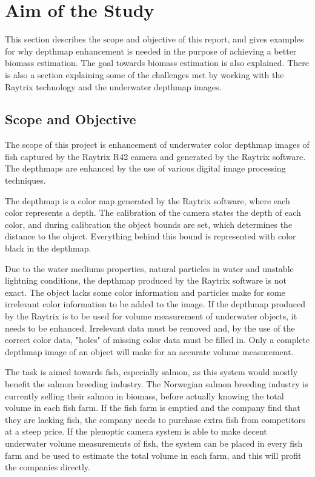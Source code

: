 \section{Aim of the Study}\label{aim of study}

This section describes the scope and objective of this report, and gives examples for why depthmap enhancement is needed in the purpose of achieving a better biomass estimation. The goal towards biomass estimation is also explained. There is also a section explaining some of the challenges met by working with the Raytrix technology and the underwater depthmap images.


\subsection{Scope and Objective}

The scope of this project is enhancement of underwater color depthmap images of fish captured by the Raytrix R42 camera and generated by the Raytrix software. The depthmaps are enhanced by the use of various digital image processing techniques.

The depthmap is a color map generated by the Raytrix software, where each color represents a depth. The calibration of the camera states the depth of each color, and during calibration the object bounds are set, which determines the distance to the object. Everything behind this bound is represented with color black in the depthmap.

Due to the water mediums properties, natural particles in water and unstable lightning conditions, the depthmap produced by the Raytrix software is not exact. The object lacks some color information and particles make for some irrelevant color information to be added to the image.
If the depthmap produced by the Raytrix is to be used for volume measurement of underwater objects, it needs to be enhanced. Irrelevant data must be removed and, by the use of the correct color data, "holes" of missing color data must be filled in.
Only a complete depthmap image of an object will make for an accurate volume measurement.

The task is aimed towards fish, especially salmon, as this system would mostly benefit the salmon breeding industry. The Norwegian salmon breeding industry is currently selling their salmon in biomass, before actually knowing the total volume in each fish farm. If the fish farm is emptied and the company find that they are lacking fish, the company needs to purchase extra fish from competitors at a steep price. 
If the plenoptic camera system is able to make decent underwater volume measurements of fish, the system can be placed in every fish farm and be used to estimate the total volume in each farm, and this will profit the companies directly.

